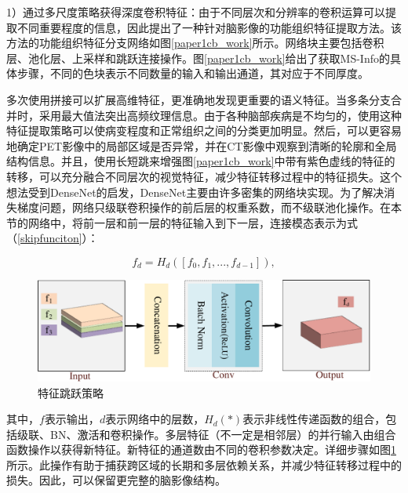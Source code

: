 1）通过多尺度策略获得深度卷积特征：由于不同层次和分辨率的卷积运算可以提取不同重要程度的信息，因此提出了一种针对脑影像的功能组织特征提取方法。该方法的功能组织特征分支网络如图\ref{paper1cb_work}所示。网络块主要包括卷积层、池化层、上采样和跳跃连接操作。图\ref{paper1cb_work}给出了获取MS-Info的具体步骤，不同的色块表示不同数量的输入和输出通道，其对应于不同厚度。

多次使用拼接可以扩展高维特征，更准确地发现更重要的语义特征。当多条分支合并时，采用最大值法突出高频纹理信息。由于各种脑部疾病是不均匀的，使用这种特征提取策略可以使病变程度和正常组织之间的分类更加明显。然后，可以更容易地确定PET影像中的局部区域是否异常，并在CT影像中观察到清晰的轮廓和全局结构信息。并且，使用长短跳来增强图\ref{paper1cb_work}中带有紫色虚线的特征的转移，可以充分融合不同层次的视觉特征，减少特征转移过程中的特征损失。这个想法受到DenseNet\cite{2016Densely}的启发，DenseNet主要由许多密集的网络块实现。为了解决消失梯度问题，网络只级联卷积操作的前后层的权重系数，而不级联池化操作。在本节的网络中，将前一层和前一层的特征输入到下一层，连接模态表示为式（\ref{skipfunciton}）：

     \begin{equation}\label{skipfunciton}
        f_{d}=H_{d}([f_{0},f_{1},...,f_{d-1}]),
     \end{equation}
     
   \begin{figure}[htb]
      \centering
          \includegraphics[width=0.9\columnwidth]{figs/paper1skip.pdf}
          \caption{特征跳跃策略}\label{paper1skip}
     \end{figure}
     
其中，$f$表示输出，$d$表示网络中的层数，$H_{d}(*)$表示非线性传递函数的组合，包括级联、BN、激活和卷积操作。多层特征（不一定是相邻层）的并行输入由组合函数操作以获得新特征。新特征的通道数由不同的卷积参数决定。详细步骤如图\ref{paper1skip}所示。此操作有助于捕获跨区域的长期和多层依赖关系，并减少特征转移过程中的损失。因此，可以保留更完整的脑影像结构。


